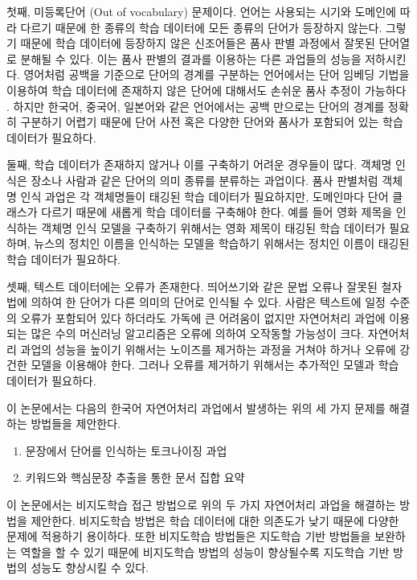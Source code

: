 \documentclass[oneside, ko,phd]{snuthesis_utf8_kor}
\begin{document}
첫째, 미등록단어 (Out of vocabulary) 문제이다.
언어는 사용되는 시기와 도메인에 따라 다르기 때문에 한 종류의 학습 데이터에 모든 종류의 단어가 등장하지 않는다.
그렇기 때문에 학습 데이터에 등장하지 않은 신조어들은 품사 판별 과정에서 잘못된 단어열로 분해될 수 있다.
이는 품사 판별의 결과를 이용하는 다른 과업들의 성능을 저하시킨다.
영어처럼 공백을 기준으로 단어의 경계를 구분하는 언어에서는 단어 임베딩 기법을 이용하여 학습 데이터에 존재하지 않은 단어에 대해서도 손쉬운 품사 추정이 가능하다 \cite{turian2010word, mikolov2013efficient, collobert2011natural}.
하지만 한국어, 중국어, 일본어와 같은 언어에서는 공백 만으로는 단어의 경계를 정확히 구분하기 어렵기 때문에 단어 사전 혹은 다양한 단어와 품사가 포함되어 있는 학습 데이터가 필요하다.

둘째, 학습 데이터가 존재하지 않거나 이를 구축하기 어려운 경우들이 많다.
객체명 인식은 장소나 사람과 같은 단어의 의미 종류를 분류하는 과업이다.
품사 판별처럼 객체명 인식 과업은 각 객체명들이 태깅된 학습 데이터가 필요하지만, 도메인마다 단어 클래스가 다르기 때문에 새롭게 학습 데이터를 구축해야 한다.
예를 들어 영화 제목을 인식하는 객체명 인식 모델을 구축하기 위해서는 영화 제목이 태깅된 학습 데이터가 필요하며, 뉴스의 정치인 이름을 인식하는 모델을 학습하기 위해서는 정치인 이름이 태깅된 학습 데이터가 필요하다.

셋째, 텍스트 데이터에는 오류가 존재한다.
띄어쓰기와 같은 문법 오류나 잘못된 철자법에 의하여 한 단어가 다른 의미의 단어로 인식될 수 있다.
사람은 텍스트에 일정 수준의 오류가 포함되어 있다 하더라도 가독에 큰 어려움이 없지만 자연어처리 과업에 이용되는 많은 수의 머신러닝 알고리즘은 오류에 의하여 오작동할 가능성이 크다.
자연어처리 과업의 성능을 높이기 위해서는 노이즈를 제거하는 과정을 거쳐야 하거나 오류에 강건한 모델을 이용해야 한다.
그러나 오류를 제거하기 위해서는 추가적인 모델과 학습 데이터가 필요하다.

이 논문에서는 다음의 한국어 자연어처리 과업에서 발생하는 위의 세 가지 문제를 해결하는 방법들을 제안한다.

\begin{enumerate}
    \item 문장에서 단어를 인식하는 토크나이징 과업
    \item 키워드와 핵심문장 추출을 통한 문서 집합 요약
\end{enumerate}

이 논문에서는 비지도학습 접근 방법으로 위의 두 가지 자연어처리 과업을 해결하는 방법을 제안한다.
비지도학습 방법은 학습 데이터에 대한 의존도가 낮기 때문에 다양한 문제에 적용하기 용이하다.
또한 비지도학습 방법들은 지도학습 기반 방법들을 보완하는 역할을 할 수 있기 때문에 비지도학습 방법의 성능이 향상될수록 지도학습 기반 방법의 성능도 향상시킬 수 있다.
\end{document}

